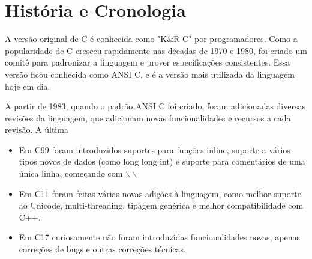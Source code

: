 \chapter{História e Cronologia}

A versão original de C é conhecida como "K\&R C" por programadores.
Como a popularidade de C cresceu rapidamente nas décadas de 1970 e 1980,
foi criado um comitê para padronizar a linguagem e prover especificações 
consistentes. Essa versão ficou conhecida como ANSI C,
e é a versão mais utilizada da linguagem hoje em dia.

A partir de 1983, quando o padrão ANSI C foi criado, foram adicionadas 
diversas revisões da linguagem, que adicionam novas funcionalidades e recursos a cada revisão. A última 

\begin{itemize}
    \item Em C99 
    foram introduzidos suportes para funções inline, suporte a vários tipos novos de dados (como long long int)
    e suporte para comentários de uma única linha, começando com \(\backslash\backslash\) 

    \item Em C11 foram feitas várias novas adições à linguagem, como melhor suporte ao Unicode, 
    multi-threading, tipagem genérica e melhor compatibilidade com C++.

    \item Em C17 curiosamente não foram introduzidas funcionalidades novas, apenas correções de bugs e outras correções técnicas.

\end{itemize}


\nocite{languageC}
\nocite{DevelopmentOfTheCLanguage}
\nocite{wikipediaC}

\newpage